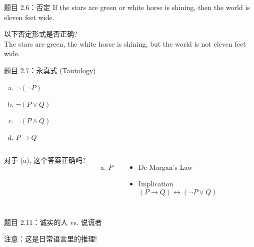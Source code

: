 \begin{frame}{}
  \begin{exampleblock}{题目 2.6：否定}
    If the stars are green or white horse is shining,
    then the world is eleven feet wide.
  \end{exampleblock}

  \vspace{0.50cm}

  以下否定形式是否正确?\\[8pt]

  The stars are green, the white horse is shining, but the world is not eleven feet wide.
\end{frame}

\begin{frame}{}
  \begin{exampleblock}{题目 2.7：永真式 (Tautology)}
    \begin{enumerate}[(a)]
      \item $\lnot(\lnot P)$
      \item $\lnot(P \lor Q)$
      \item $\lnot(P \land Q)$
      \item $P \to Q$
    \end{enumerate}
  \end{exampleblock}

  \vspace{0.30cm}
  \begin{columns}
      对于 (a), 这个答案正确吗?
      \begin{enumerate}[(a)]
	\item $P$
      \end{enumerate}
    \pause
      \begin{itemize}
	\item De Morgan's Law
	\item Implication
	  \[
	    (P \to Q) \leftrightarrow (\lnot P \lor Q)
	  \]
      \end{itemize}
  \end{columns}

\end{frame}

\begin{frame}{}
  \begin{exampleblock}{题目 2.11：诚实的人 vs. 说谎者}

  \end{exampleblock}

  \vspace{0.30cm}
  \centerline{注意：这是日常语言里的推理!}
\end{frame}
